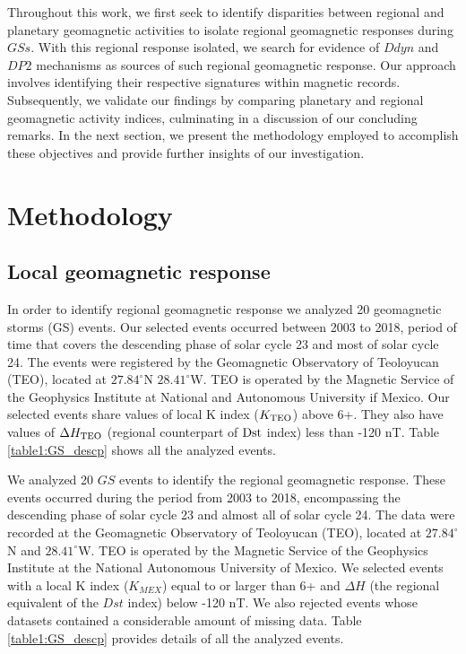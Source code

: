 \documentclass[a4paper,fleqn]{cas-dc}
\begin{document}
Throughout this work, we first seek to identify disparities between regional and planetary geomagnetic activities to isolate regional geomagnetic responses during $GSs$. With this regional response isolated, we search for evidence of $Ddyn$ and $DP2$ mechanisms as sources of such regional geomagnetic response. Our approach involves identifying their respective signatures within magnetic records. Subsequently, we validate our findings by comparing planetary and regional geomagnetic activity indices, culminating in a discussion of our concluding remarks. In the next section, we present the methodology employed to accomplish these objectives and provide further insights of our investigation.

\section{Methodology}
\label{Methodology}

\subsection{Local geomagnetic response}
\label{local response}
In order to identify regional geomagnetic response we analyzed 20 geomagnetic storms (GS) events. Our selected events occurred between 2003 to 2018, period of time that covers the descending phase of solar cycle 23 and most of solar cycle 24. The events were registered by the Geomagnetic Observatory of Teoloyucan (TEO), located at $27.84^\circ$N $28.41^\circ$W. TEO is operated by the Magnetic Service of the Geophysics Institute at National and Autonomous University if Mexico. Our selected events share values of local K index ($K_{\rm TEO}$) above 6+. They also have values of $\Delta {H_{\rm TEO}}$ (regional counterpart of ${\rm Dst}$ index) less than -120 nT. Table \ref{table1:GS_descp} shows all the analyzed events.

We analyzed 20 $GS$ events to identify the regional geomagnetic response. These events occurred during the period from 2003 to 2018, encompassing the descending phase of solar cycle 23 and almost all of solar cycle 24. The data were recorded at the Geomagnetic Observatory of Teoloyucan (TEO), located at $27.84^\circ$N and $28.41^\circ$W. TEO is operated by the Magnetic Service of the Geophysics Institute at the National Autonomous University of Mexico. We selected events with a local K index ($K_{MEX}$) equal to or larger than 6+ and $\Delta {H}$ (the regional equivalent of the ${Dst}$ index) below -120 nT. We also rejected events whose datasets contained a considerable amount of missing data. Table \ref{table1:GS_descp} provides details of all the analyzed events.
\end{document}
